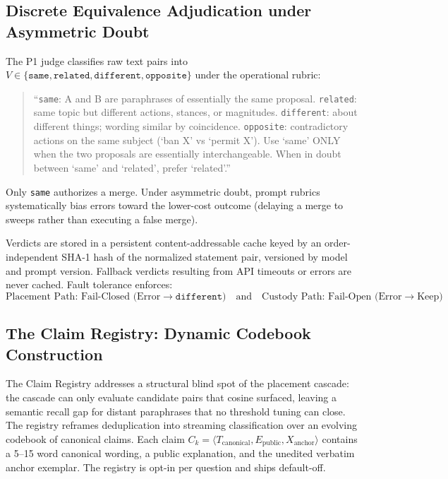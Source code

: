 \documentclass{article}
\begin{document}
\subsection{Discrete Equivalence Adjudication under Asymmetric Doubt}

The P1 judge classifies raw text pairs into $V \in \{\texttt{same}, \texttt{related}, \texttt{different}, \texttt{opposite}\}$ under the operational rubric:

\begin{quote}
\small
``\texttt{same}: A and B are paraphrases of essentially the same proposal. \texttt{related}: same topic but different actions, stances, or magnitudes. \texttt{different}: about different things; wording similar by coincidence. \texttt{opposite}: contradictory actions on the same subject (`ban X' vs `permit X'). Use `same' ONLY when the two proposals are essentially interchangeable. When in doubt between `same' and `related', prefer `related'.''
\end{quote}

Only \texttt{same} authorizes a merge. Under asymmetric doubt, prompt rubrics systematically bias errors toward the lower-cost outcome (delaying a merge to sweeps rather than executing a false merge).

Verdicts are stored in a persistent content-addressable cache keyed by an order-independent SHA-1 hash of the normalized statement pair, versioned by model and prompt version. Fallback verdicts resulting from API timeouts or errors are never cached. Fault tolerance enforces:
\begin{equation}
\text{Placement Path: Fail-Closed (Error} \rightarrow \texttt{different}) \quad \text{and} \quad \text{Custody Path: Fail-Open (Error} \rightarrow \text{Keep)}
\end{equation}

\subsection{The Claim Registry: Dynamic Codebook Construction}
\label{sec:registry}

The Claim Registry addresses a structural blind spot of the placement cascade: the cascade can only evaluate candidate pairs that cosine surfaced, leaving a semantic recall gap for distant paraphrases that no threshold tuning can close. The registry reframes deduplication into streaming classification over an evolving codebook of canonical claims. Each claim $C_k = \langle T_{\mathrm{canonical}}, E_{\mathrm{public}}, X_{\mathrm{anchor}} \rangle$ contains a 5--15 word canonical wording, a public explanation, and the unedited verbatim anchor exemplar. The registry is opt-in per question and ships default-off.
\end{document}
